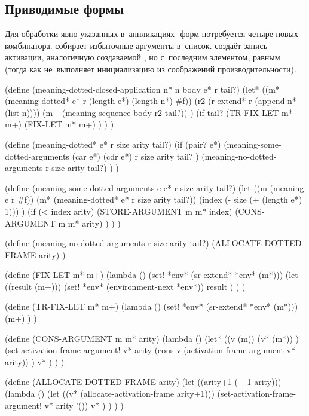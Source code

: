 \subsection{Приводимые формы}\label{fast/dilute/ssect:reducible}

Для обработки явно указанных в~аппликациях -форм потребуется четыре
новых комбинатора.  собирает избыточные аргументы в~список.
 создаёт запись активации, аналогичную создаваемой
, но с~последним элементом, равным~\ic{()} (тогда как
 не~выполняет инициализацию из соображений
производительности).

\begin{code:lisp}
(define (meaning-dotted-closed-application n* n body e* r tail?)
  (let* ((m* (meaning-dotted* e* r (length e*) (length n*) #f))
         (r2 (r-extend* r (append n* (list n))))
         (m+ (meaning-sequence body r2 tail?)) )
    (if tail? (TR-FIX-LET m* m+)
              (FIX-LET m* m+) ) ) )

(define (meaning-dotted* e* r size arity tail?)
  (if (pair? e*)
      (meaning-some-dotted-arguments (car e*) (cdr e*)
                                     r size arity tail? )
      (meaning-no-dotted-arguments r size arity tail?) ) )

(define (meaning-some-dotted-arguments e e* r size arity tail?)
  (let ((m (meaning e r #f))
        (m* (meaning-dotted* e* r size arity tail?))
        (index (- size (+ (length e*) 1))) )
    (if (< index arity)
        (STORE-ARGUMENT m m* index)
        (CONS-ARGUMENT m m* arity) ) ) )

(define (meaning-no-dotted-arguments r size arity tail?)
  (ALLOCATE-DOTTED-FRAME arity) )

(define (FIX-LET m* m+)
  (lambda ()
    (set! *env* (sr-extend* *env* (m*)))
    (let ((result (m+)))
      (set! *env* (environment-next *env*))
      result ) ) )

(define (TR-FIX-LET m* m+)
  (lambda ()
    (set! *env* (sr-extend* *env* (m*)))
    (m+) ) )

(define (CONS-ARGUMENT m m* arity)
  (lambda ()
    (let* ((v  (m))
           (v* (m*)) )
      (set-activation-frame-argument! v* arity
       (cons v (activation-frame-argument v* arity)) )
      v* ) ) )

(define (ALLOCATE-DOTTED-FRAME arity)
  (let ((arity+1 (+ 1 arity)))
    (lambda ()
      (let ((v* (allocate-activation-frame arity+1)))
        (set-activation-frame-argument! v* arity '())
        v* ) ) ) )
\end{code:lisp}


